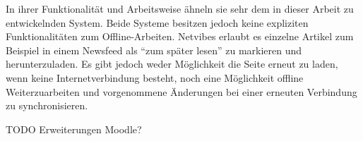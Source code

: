 In ihrer Funktionalität und Arbeitsweise ähneln sie sehr dem in dieser Arbeit zu entwickelnden System. Beide Systeme besitzen jedoch keine expliziten Funktionalitäten zum Offline-Arbeiten. Netvibes erlaubt es einzelne Artikel zum Beispiel in einem Newsfeed als "`zum später lesen"' zu markieren und herunterzuladen. Es gibt jedoch weder Möglichkeit die Seite erneut zu laden, wenn keine Internetverbindung besteht, noch eine Möglichkeit offline Weiterzuarbeiten und vorgenommene Änderungen bei einer erneuten Verbindung zu synchronisieren. 

TODO Erweiterungen Moodle?